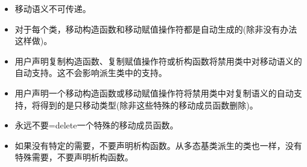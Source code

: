 \begin{itemize}
	\item 移动语义不可传递。
	\item 对于每个类，移动构造函数和移动赋值操作符都是自动生成的(除非没有办法这样做)。
	\item 用户声明复制构造函数、复制赋值操作符或析构函数将禁用类中对移动语义的自动支持。这不会影响派生类中的支持。
	\item 用户声明一个移动构造函数或移动赋值操作符将禁用类中对复制语义的自动支持，将得到的是只移动类型(除非这些特殊的移动成员函数删除)。
	\item 永远不要=delete一个特殊的移动成员函数。
	\item 如果没有特定的需要，不要声明析构函数。从多态基类派生的类也一样，没有特殊需要，不要声明析构函数。
\end{itemize}


\newpage